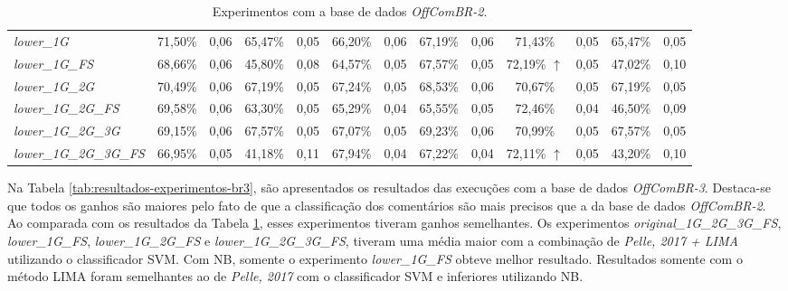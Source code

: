 \begin{table}[h]
{\begin{tabular}{l|cccc|cccc|cccc}
\textit{lower\_1G} & 71,50\% & 0,06 & 65,47\% & 0,05 & 66,20\% & 0,06 & 67,19\% & 0,06 & 71,43\% & 0,05 & 65,47\% & 0,05 \\
\textit{lower\_1G\_FS} & 68,66\% & 0,06 & 45,80\% & 0,08 & 64,57\% & 0,05 & 67,57\% & 0,05 & 72,19\% $\uparrow$ & 0,05 & 47,02\% & 0,10 \\
\textit{lower\_1G\_2G} & 70,49\% & 0,06 & 67,19\% & 0,05 & 67,24\% & 0,05 & 68,53\% & 0,06 & 70,67\% & 0,05 & 67,19\% & 0,05 \\
\textit{lower\_1G\_2G\_FS} & 69,58\% & 0,06 & 63,30\% & 0,05 & 65,29\% & 0,04 & 65,55\% & 0,05 & 72,46\% & 0,04 & 46,50\% & 0,09 \\
\textit{lower\_1G\_2G\_3G} & 69,15\% & 0,06 & 67,57\% & 0,05 & 67,07\% & 0,05 & 69,23\% & 0,06 & 70,99\% & 0,05 & 67,57\% & 0,05 \\
\textit{lower\_1G\_2G\_3G\_FS} & 66,95\% & 0,05 & 41,18\% & 0,11 & 67,94\% & 0,04 & 67,22\% & 0,04 & 72,11\% $\uparrow$ & 0,05 & 43,20\% & 0,10 \\ \hline
\end{tabular}
}
\caption{Experimentos com a base de dados {\it OffComBR-2}.}\label{tab:resultados-experimentos-br2}
\end{table}

Na Tabela \ref{tab:resultados-experimentos-br3}, são apresentados os resultados das execuções com a base de dados {\it OffComBR-3}. Destaca-se que todos os ganhos são maiores pelo fato de que a classificação dos comentários são mais precisos que a da base de dados {\it OffComBR-2}. Ao comparada com os resultados da Tabela \ref{tab:resultados-experimentos-br2}, esses experimentos tiveram ganhos semelhantes. Os experimentos {\it original\_1G\_2G\_3G\_FS}, {\it lower\_1G\_FS}, {\it lower\_1G\_2G\_FS} e {\it lower\_1G\_2G\_3G\_FS}, tiveram uma média maior com a combinação de {\it Pelle, 2017 + LIMA} utilizando o classificador SVM. Com NB, somente o experimento {\it lower\_1G\_FS} obteve melhor resultado. Resultados somente com o método LIMA foram semelhantes ao de {\it Pelle, 2017} com o classificador SVM e inferiores utilizando NB.

